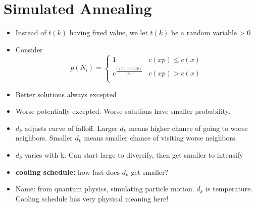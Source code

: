 \documentclass[12pt, letter]{article}
\begin{document}
\section{Simulated Annealing}%
\begin{itemize}
    \item Instead of $t(k)$ having fixed value, we let $t(k)$ be a random variable > 0
    \item Consider 
    \[ 
    p(N_i)=
    \begin{cases}
        1 & c(xp) \le c(x) \\
        e^{\frac{c(x)-c(xp)}{d_k}} & c(xp) > c(x) \\
    \end{cases}
    \]
    \item Better solutions always excepted
    \item Worse potentially excepted. Worse solutions have smaller probability.
    \item $d_k$ adjusts curve of falloff. Larger $d_k$ means higher chance of going to worse neighbors. Smaller $d_k$ means smaller chance of visiting worse neighbors.
    \item $d_k$ varies with k. Can start large to diversify, then get smaller to intensify
    \item \textbf{cooling schedule:} how fast does $d_k$ get smaller?
    \item Name: from quantum physics, simulating particle motion. $d_k$ is temperature. Cooling schedule has very physical meaning here!
\end{itemize}
\end{document}
